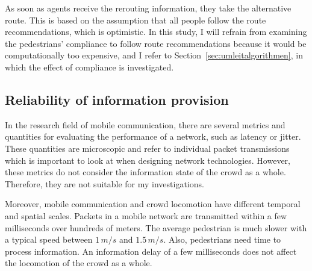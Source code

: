As soon as agents receive the rerouting information, they take the alternative route. This is based on the assumption that all people follow the route recommendations, which is optimistic. In this study, I will refrain from examining the pedestrians' compliance to follow route recommendations because it would be computationally too expensive, and I refer to Section~\ref{sec:umleitalgorithmen}, in which the effect of compliance is investigated.













\subsection{Reliability of information provision}

In the research field of mobile communication, there are several metrics and quantities for evaluating the performance of a network, such as latency or jitter. These quantities are microscopic and refer to individual packet transmissions which is important to look at when designing network technologies. However, these metrics do not consider the information state of the crowd as a whole. Therefore, they are not suitable for my investigations.

Moreover, mobile communication and crowd locomotion have different temporal and spatial scales. Packets in a mobile network are transmitted within a few milliseconds over hundreds of meters. The average pedestrian is much slower with a typical speed between $1\,m/s$ and $1.5\,m/s$. Also, pedestrians need time to process information. An information delay of a few milliseconds does not affect the locomotion of the crowd as a whole. 

